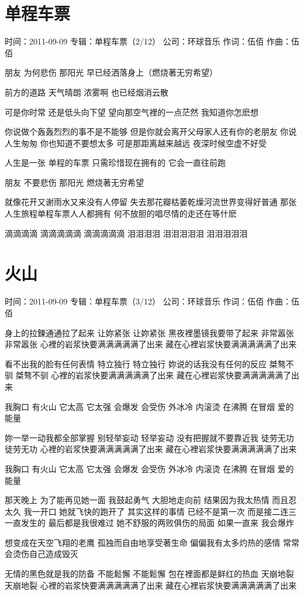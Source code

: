 \documentclass[UTF8,a4paper,oneside,twocolumn,12pt]{ctexbook}
\newcommand{\infopair}[2]{\textbullet #1：#2}
\newcommand{\zc}[1][伍佰]{\infopair{作词}{#1}}
\newcommand{\zq}[1][伍佰]{\infopair{作曲}{#1}}
\newcommand{\zj}[1]{\infopair{专辑}{#1}}
\newcommand{\sj}[1]{\infopair{时间}{#1}}
\newcommand{\gs}[1]{\infopair{公司}{#1}}
\newenvironment{info}{\begin{flushleft}\kaishu
	}
	{\end{flushleft}\normalsize\yahei\par}
\newenvironment{lyric}{
	}
{}
\begin{document}
\section{单程车票}
\begin{info}
	\sj{2011-09-09}
	\zj{单程车票（2/12）}
	\gs{环球音乐}
	\zc
	\zq
\end{info}
\begin{lyric}
	朋友 为何悲伤
	那阳光 早已经洒落身上（燃烧著无穷希望）

	前方的道路 天气晴朗
	浓雾啊 也已经烟消云散

	可是你时常 还是低头向下望
	望向那空气裡的一点茫然 我知道你怎麽想

	你说做个轰轰烈烈的事不是不能够
	但是你就会离开父母家人还有你的老朋友
	你说人生匆匆 你也知道不要想太多
	可是那距离越来越远 夜深时候空虚不好受

	人生是一张 单程的车票
	只需珍惜现在拥有的 它会一直往前跑

	朋友 不要悲伤
	那阳光 燃烧著无穷希望

	就像花开又谢雨水又来没有人停留
	失去那花瓣枯萎乾燥河流世界变得好普通
	那张人生旅程单程车票人人都拥有
	何不放胆的唱尽情的走还在等什麽

	滴滴滴滴 滴滴滴滴滴 滴滴滴滴滴
	泪泪泪泪 泪泪泪泪泪 泪泪泪泪泪
\end{lyric}

\section{火山}
\begin{info}
	\sj{2011-09-09}
	\zj{单程车票（3/12）}
	\gs{环球音乐}
	\zc
	\zq
\end{info}
\begin{lyric}
	身上的拉鍊通通拉了起来
	让妳紧张 让妳紧张
	黑夜裡墨镜我要带了起来
	非常嚣张 非常嚣张
	心裡的岩浆快要满满满满满了出来
	藏在心裡岩浆快要满满满满满了出来

	看不出我的脸有任何表情
	特立独行 特立独行
	妳说的话我没有任何的反应
	桀骜不驯 桀骜不驯
	心裡的岩浆快要满满满满满了出来
	藏在心裡岩浆快要满满满满满了出来

	我胸口 有火山 它太高 它太强
	会爆发 会受伤 外冰冷 内滚烫
	在沸腾 在冒烟 爱的能量

	妳一举一动我都全部掌握
	别轻举妄动 轻举妄动
	没有把握就不要靠近我
	徒劳无功 徒劳无功
	心裡的岩浆快要满满满满满了出来
	藏在心裡岩浆快要满满满满满了出来

	我胸口 有火山 它太高 它太强
	会爆发 会受伤 外冰冷 内滚烫
	在沸腾 在冒烟 爱的能量

	那天晚上 为了能再见她一面
	我鼓起勇气 大胆地走向前
	结果因为我太热情 而且忍太久
	我一开口 她就飞快的跑开了
	其实这样的事情 已经不是第一次
	而是接二连三一直发生的
	最后都是我很难过
	她不舒服的两败俱伤的局面
	如果一直来 我会爆炸

	想变成在天空飞翔的老鹰
	孤独而自由地享受著生命
	偏偏我有太多灼热的感情
	常常会烫伤自己造成毁灭

	无情的黑色就是我的防备
	不能鬆懈 不能鬆懈
	包在裡面都是鲜红的热血
	天崩地裂 天崩地裂
	心裡的岩浆快要满满满满满了出来
	藏在心裡岩浆快要满满满满满了出来
\end{lyric}
\end{document}
